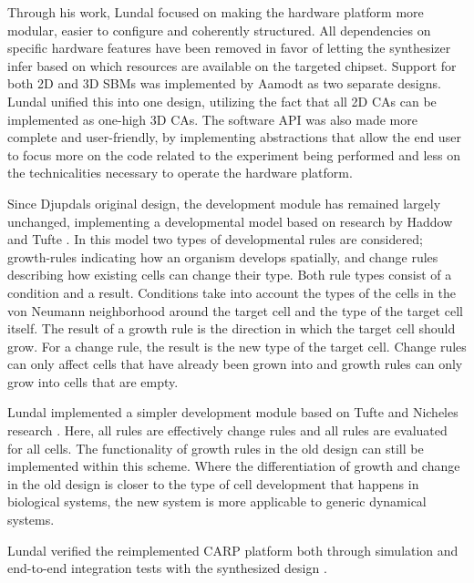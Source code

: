 Through his work, Lundal focused on making the hardware platform more modular,
easier to configure and coherently structured. All dependencies on specific
hardware features have been removed in favor of letting the synthesizer infer
based on which resources are available on the targeted chipset. Support for both
2D and 3D SBMs was implemented by Aamodt as two separate designs. Lundal unified
this into one design, utilizing the fact that all 2D CAs can be implemented as
one-high 3D CAs. The software API was also made more complete and user-friendly,
by implementing abstractions that allow the end user to focus more on the code
related to the experiment being performed and less on the technicalities
necessary to operate the hardware platform.

Since Djupdals original design, the development module has remained largely
unchanged, implementing a developmental model based on research by Haddow and
Tufte \cite{Tufte2005a}. In this model two types of developmental rules are
considered; growth-rules indicating how an organism develops spatially, and
change rules describing how existing cells can change their type. Both rule
types consist of a condition and a result. Conditions take into account the
types of the cells in the von Neumann neighborhood around the target cell and
the type of the target cell itself. The result of a growth rule is the direction
in which the target cell should grow. For a change rule, the result is the new
type of the target cell. Change rules can only affect cells that have already
been grown into and growth rules can only grow into cells that are empty.

Lundal implemented a simpler development module based on Tufte and Nicheles
research \cite{Nichele2013}. Here, all rules are effectively change rules and all
rules are evaluated for all cells. The functionality of growth rules in the old
design can still be implemented within this scheme. Where the differentiation of
growth and change in the old design is closer to the type of cell development
that happens in biological systems, the new system is more applicable to generic
dynamical systems.

Lundal verified the reimplemented CARP platform both through simulation and
end-to-end integration tests with the synthesized design . 

\cleardoublepage

